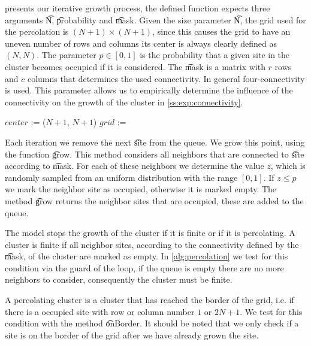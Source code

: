  presents our iterative growth process, the defined function expects three arguments \t{N}, \t{probability} and \t{mask}. Given the size parameter \t{N}, the grid used for the percolation is $(N + 1) \times (N + 1)$, since this causes the grid to have an uneven number of rows and columns its center is always clearly defined as $(N, N)$. The parameter $p \in [0, 1]$ is the probability that a given site in the cluster becomes occupied if it is considered. The \t{mask} is a matrix with $r$ rows and $c$ columns that determines the used connectivity. In general four-connectivity is used. This parameter allows us to empirically determine the influence of the connectivity on the growth of the cluster in \cref{ss:exp:connectivity}.

\begin{algorithm}[t]
	\SetAlgoShortEnd
	\DontPrintSemicolon
	\BlankLine

	$center$ := ($N + 1$, $N + 1$)\; 
	\; 
	$grid$ := \; 

	\; 
	\caption{$(mask, N, p)$\label{alg:percolation}}
\end{algorithm}

Each iteration we remove the next \t{site} from the queue. We grow this point, using the function \t{grow}. This method considers all neighbors that are connected to \t{site} according to \t{mask}. For each of these neighbors we determine the value $z$, which is randomly sampled from an uniform distribution with the range $[0,1]$. If $z \leq p$ we mark the neighbor site as occupied, otherwise it is marked empty. The method \t{grow} returns the neighbor sites that are occupied, these are added to the queue. 

The model stops the growth of the cluster if it is finite or if it is percolating. A cluster is finite if all neighbor sites, according to the connectivity defined by the \t{mask}, of the cluster are marked as empty. In \cref{alg:percolation} we test for this condition via the guard of the loop, if the queue is empty there are no more neighbors to consider, consequently the cluster must be finite. 

A percolating cluster is a cluster that has reached the border of the grid, i.e. if there is a occupied site with row or column number $1$ or $2N + 1$. We test for this condition with the method \t{onBorder}. It should be noted that we only check if a site is on the border of the grid after we have already grown the site. 


